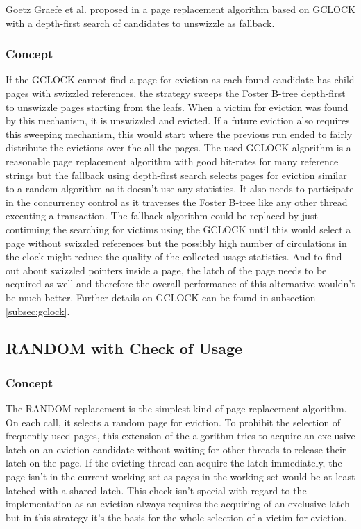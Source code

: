     Goetz Graefe et al. proposed in \cite{Graefe:2014} a page replacement algorithm based on GCLOCK with a depth-first search of candidates to unswizzle as fallback.

\subsubsection{Concept}

     If the GCLOCK cannot find a page for eviction as each found candidate has child pages with swizzled references, the strategy sweeps the Foster B-tree depth-first to unswizzle pages starting from the leafs. When a victim for eviction was found by this mechanism, it is unswizzled and evicted. If a future eviction also requires this sweeping mechanism, this would start where the previous run ended to fairly distribute the evictions over the all the pages. The used GCLOCK algorithm is a reasonable page replacement algorithm with good hit-rates for many reference strings but the fallback using depth-first search selects pages for eviction similar to a random algorithm as it doesn't use any statistics. It also needs to participate in the concurrency control as it traverses the Foster B-tree like any other thread executing a transaction. The fallback algorithm could be replaced by just continuing the searching for victims using the GCLOCK until this would select a page without swizzled references but the possibly high number of circulations in the clock might reduce the quality of the collected usage statistics. And to find out about swizzled pointers inside a page, the latch of the page needs to be acquired as well and therefore the overall performance of this alternative wouldn't be much better. Further details on GCLOCK can be found in subsection \ref{subsec:gclock}.

\subsection{RANDOM with Check of Usage}

\subsubsection{Concept}

    The RANDOM replacement is the simplest kind of page replacement algorithm. On each call, it selects a random page for eviction. To prohibit the selection of frequently used pages, this extension of the algorithm tries to acquire an exclusive latch on an eviction candidate without waiting for other threads to release their latch on the page. If the evicting thread can acquire the latch immediately, the page isn't in the current working set as pages in the working set would be at least latched with a shared latch. This check isn't special with regard to the implementation as an eviction always requires the acquiring of an exclusive latch but in this strategy it's the basis for the whole selection of a victim for eviction.


